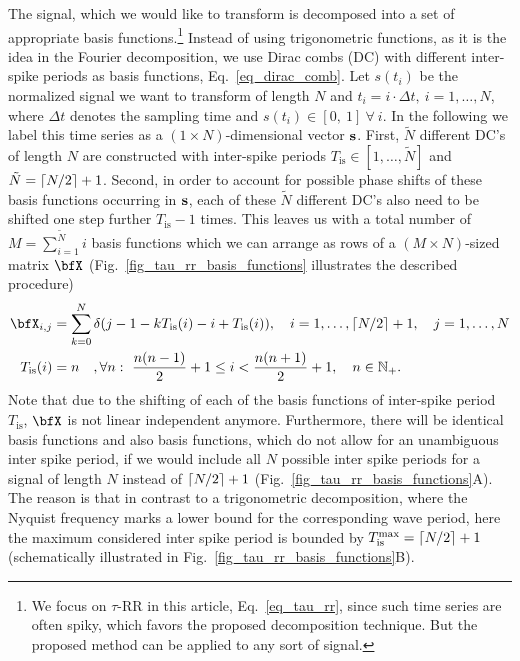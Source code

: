\documentclass[entropy,article,submit,pdftex,moreauthors]{Definitions/mdpi}
\DeclarePairedDelimiter\ceil{\lceil}{\rceil}
\begin{document}
The signal, which we would like to transform is decomposed into a set of appropriate basis functions.\footnote{We focus on $\tau$-RR in this article, Eq.~\eqref{eq_tau_rr}, since 
such time series are often spiky, which favors the proposed decomposition technique. But the proposed method can be applied to any sort of signal.} Instead of using trigonometric 
functions, as it is the idea in the Fourier decomposition, we use Dirac combs (DC) with 
different inter-spike periods as basis functions, Eq.~\eqref{eq_dirac_comb}. Let $s(t_i)$ be the normalized signal we want to transform of length $N$ and 
$t_i=i\cdot \Delta t,~i=1,\ldots,N$, where $\Delta t$ denotes the sampling time and $s(t_i) \in [0,\ 1]\ \forall\ i$. In the following we label this time series as a $(1\times N)$-dimensional 
vector $\bf{s}$. 
First, $\tilde{N}$ different DC's of length $N$ are constructed with inter-spike periods $T_\text{is} \in [1,\ldots,\tilde{N}]$ and $\tilde{N}=\ceil*{N/2}+1$. Second, in order to account 
for possible phase shifts of 
these basis functions occurring in $\bf{s}$, each of these $\tilde{N}$ different DC's also need to be shifted one step further $T_\text{is}-1$ times. This leaves us with a total number of 
$M = \sum_{i=1}^{\tilde{N}}i$ 
basis functions which we can arrange as rows of a $(M\times N)$-sized matrix $\bfX$
(Fig.~\ref{fig_tau_rr_basis_functions} illustrates the described procedure)
\begin{align}
\label{eq_basis_matrix} \bfX_{i,j} &= \sum_{k=0}^{N}\delta\left(j-1-kT_\text{is}(i)-i+T_\text{is}(i) \right), \quad i=1,\dots,\ceil*{N/2}+1, \quad j=1,\dots,N\\
\label{eq_T_is} T_\text{is}(i)&= n \quad, \forall n:~ \frac{n(n-1)}{2} + 1 \leq i <  \frac{n(n+1)}{2} + 1,\quad n \in \mathbb{N}_+.
\end{align}
Note that due to the shifting of each of the basis functions of inter-spike period $T_\text{is}$, $\bfX$ is not linear independent anymore. 
Furthermore, there will be identical basis functions and also basis functions, which do not allow for an unambiguous inter spike period, 
if we would include all $N$ possible inter spike periods for a signal of length $N$ instead of $\ceil*{N/2}+1$ (Fig.~\ref{fig_tau_rr_basis_functions}A). 
The reason is that in contrast to a trigonometric decomposition, where the Nyquist frequency marks a lower bound for the corresponding wave period, here 
the maximum considered inter spike period is bounded by $T_{\text{is}}^{\text{max}} = \ceil*{N/2}+1$ (schematically illustrated in 
Fig.~\ref{fig_tau_rr_basis_functions}B).\\ 
\end{document}
